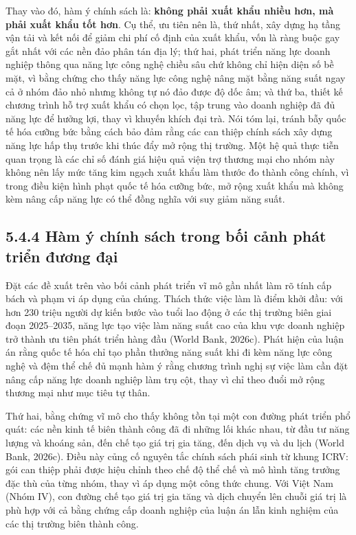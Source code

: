 \documentclass[
  a4paper,
  13pt]{extreport}
\begin{document}
Thay vào đó, hàm ý chính sách là: \textbf{không phải xuất khẩu nhiều
hơn, mà phải xuất khẩu tốt hơn}. Cụ thể, ưu tiên nên là, thứ nhất, xây
dựng hạ tầng vận tải và kết nối để giảm chi phí cố định của xuất khẩu,
vốn là ràng buộc gay gắt nhất với các nền đảo phân tán địa lý; thứ hai,
phát triển năng lực doanh nghiệp thông qua năng lực công nghệ chiều sâu
chứ không chỉ hiện diện số bề mặt, vì bằng chứng cho thấy năng lực công
nghệ nâng mặt bằng năng suất ngay cả ở nhóm đảo nhỏ nhưng không tự nó
đảo được độ dốc âm; và thứ ba, thiết kế chương trình hỗ trợ xuất khẩu có
chọn lọc, tập trung vào doanh nghiệp đã đủ năng lực để hưởng lợi, thay
vì khuyến khích đại trà. Nói tóm lại, tránh bẫy quốc tế hóa cưỡng bức
bằng cách bảo đảm rằng các can thiệp chính sách xây dựng năng lực hấp
thụ trước khi thúc đẩy mở rộng thị trường. Một hệ quả thực tiễn quan
trọng là các chỉ số đánh giá hiệu quả viện trợ thương mại cho nhóm này
không nên lấy mức tăng kim ngạch xuất khẩu làm thước đo thành công
chính, vì trong điều kiện hình phạt quốc tế hóa cưỡng bức, mở rộng xuất
khẩu mà không kèm nâng cấp năng lực có thể đồng nghĩa với suy giảm năng
suất.

\hypertarget{huxe0m-uxfd-chuxednh-suxe1ch-trong-bux1ed1i-cux1ea3nh-phuxe1t-triux1ec3n-ux111ux1b0ux1a1ng-ux111ux1ea1i}{%
\subsection{5.4.4 Hàm ý chính sách trong bối cảnh phát triển đương
đại}\label{huxe0m-uxfd-chuxednh-suxe1ch-trong-bux1ed1i-cux1ea3nh-phuxe1t-triux1ec3n-ux111ux1b0ux1a1ng-ux111ux1ea1i}}

Đặt các đề xuất trên vào bối cảnh phát triển vĩ mô gần nhất làm rõ tính
cấp bách và phạm vi áp dụng của chúng. Thách thức việc làm là điểm khởi
đầu: với hơn 230 triệu người dự kiến bước vào tuổi lao động ở các thị
trường biên giai đoạn 2025--2035, năng lực tạo việc làm năng suất cao
của khu vực doanh nghiệp trở thành ưu tiên phát triển hàng đầu (World
Bank, 2026c). Phát hiện của luận án rằng quốc tế hóa chỉ tạo phần thưởng
năng suất khi đi kèm năng lực công nghệ và đệm thể chế đủ mạnh hàm ý
rằng chương trình nghị sự việc làm cần đặt nâng cấp năng lực doanh
nghiệp làm trụ cột, thay vì chỉ theo đuổi mở rộng thương mại như mục
tiêu tự thân.

Thứ hai, bằng chứng vĩ mô cho thấy không tồn tại một con đường phát
triển phổ quát: các nền kinh tế biên thành công đã đi những lối khác
nhau, từ đầu tư năng lượng và khoáng sản, đến chế tạo giá trị gia tăng,
đến dịch vụ và du lịch (World Bank, 2026c). Điều này củng cố nguyên tắc
chính sách phái sinh từ khung ICRV: gói can thiệp phải được hiệu chỉnh
theo chế độ thể chế và mô hình tăng trưởng đặc thù của từng nhóm, thay
vì áp dụng một công thức chung. Với Việt Nam (Nhóm IV), con đường chế
tạo giá trị gia tăng và dịch chuyển lên chuỗi giá trị là phù hợp với cả
bằng chứng cấp doanh nghiệp của luận án lẫn kinh nghiệm của các thị
trường biên thành công.
\end{document}
